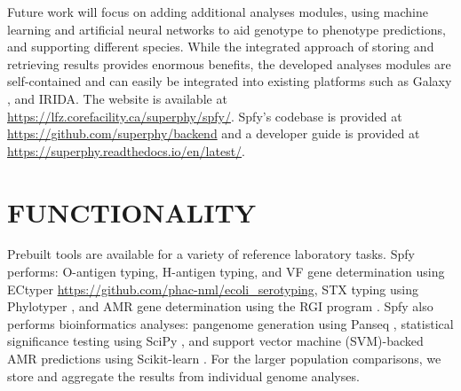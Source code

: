 \documentclass[a4,center,fleqn]{NAR}
\begin{document}
Future work will focus on adding additional analyses modules, using machine learning and artificial neural networks to aid genotype to phenotype predictions, and supporting different species. While the integrated approach of storing and retrieving results provides enormous benefits, the developed analyses modules are self-contained and can easily be integrated into existing platforms such as Galaxy \citep{goecks2010galaxy}, and IRIDA. The website is available at \url{https://lfz.corefacility.ca/superphy/spfy/}. Spfy's codebase is provided at \url{https://github.com/superphy/backend} and a developer guide is provided at \url{https://superphy.readthedocs.io/en/latest/}.



\enlargethispage{-65.1pt}



\section{FUNCTIONALITY}

Prebuilt tools are available for a variety of reference laboratory tasks.
Spfy performs: O-antigen typing, H-antigen typing, and VF gene determination using ECtyper \url{https://github.com/phac-nml/ecoli\_serotyping}, STX typing using Phylotyper \citep{whiteside2017phylotyper}, and AMR gene determination using the RGI program \citep{mcarthur2013comprehensive}. Spfy also performs bioinformatics analyses: pangenome generation using Panseq \citep{laing2010pan}, statistical significance testing using SciPy \citep{jones2014scipy}, and support vector machine (SVM)-backed AMR predictions using Scikit-learn \citep{pedregosa2011scikit}.
For the larger population comparisons, we store and aggregate the results from individual genome analyses.
\end{document}
